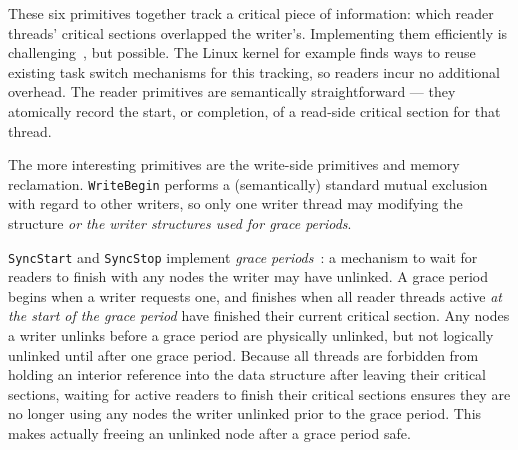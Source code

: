 These six primitives together track a critical piece of information: which reader threads' critical sections overlapped the writer's.
Implementing them efficiently is challenging~\cite{urcu_ieee}, but possible.
The Linux kernel for example finds ways to reuse existing task switch mechanisms for this tracking, so readers incur no additional overhead.
The reader primitives are semantically straightforward --- they atomically record the start, or completion, of a read-side critical section for that thread.

The more interesting primitives are the write-side primitives and memory reclamation.
\lstinline|WriteBegin| performs a (semantically) standard mutual exclusion with regard to other writers, so only one writer thread may modifying the structure \emph{or the writer structures used for grace periods}. %

\lstinline|SyncStart| and \lstinline|SyncStop| implement \emph{grace periods}~\cite{grc}: a mechanism to wait for readers to finish with any nodes the writer may have unlinked.  A grace period begins when a writer requests one, and finishes when all reader threads active \emph{at the start of the grace period} have finished their current critical section.
Any nodes a writer unlinks before a grace period are physically unlinked, but not logically unlinked until after one grace period. 
Because all threads are forbidden from holding an interior reference into the data structure after leaving their critical sections, waiting for active readers to finish their critical sections ensures they are no longer using any nodes the writer unlinked prior to the grace period.
This makes actually freeing an unlinked node after a grace period safe.

